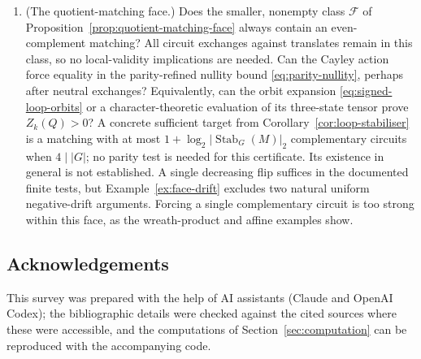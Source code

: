 \documentclass[11pt,a4paper]{article}
\theoremstyle{definition}
\theoremstyle{remark}
\begin{document}
\begin{enumerate}[leftmargin=2em]
\item (The quotient-matching face.)  Does the smaller, nonempty class $\mathcal F$ of Proposition~\ref{prop:quotient-matching-face} always contain an even-complement matching?  All circuit exchanges against translates remain in this class, so no local-validity implications are needed.  Can the Cayley action force equality in the parity-refined nullity bound \eqref{eq:parity-nullity}, perhaps after neutral exchanges?  Equivalently, can the orbit expansion \eqref{eq:signed-loop-orbits} or a character-theoretic evaluation of its three-state tensor prove $Z_k(Q)>0$?  A concrete sufficient target from Corollary~\ref{cor:loop-stabiliser} is a matching with at most $1+\log_2|\operatorname{Stab}_G(M)|_2$ complementary circuits when $4\mid |G|$; no parity test is needed for this certificate.  Its existence in general is not established.  A single decreasing flip suffices in the documented finite tests, but Example~\ref{ex:face-drift} excludes two natural uniform negative-drift arguments.  Forcing a single complementary circuit is too strong within this face, as the wreath-product and affine examples show.
\end{enumerate}

\subsection*{Acknowledgements}
This survey was prepared with the help of AI assistants (Claude and OpenAI Codex); the bibliographic details were checked against the cited sources where these were accessible, and the computations of Section~\ref{sec:computation} can be reproduced with the accompanying code.
\end{document}
